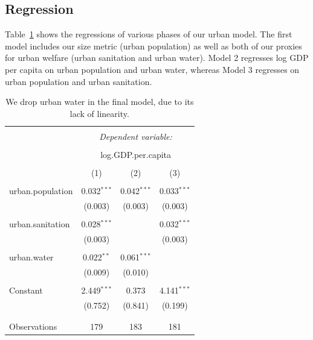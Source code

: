 \documentclass[11pt]{article}
\begin{document}
\subsection{Regression}

Table~\ref{urban_model_regressions} shows the regressions of various phases of our urban model.
The first model includes our size metric (urban population) as well as both of our proxies for urban welfare (urban sanitation and urban water).
Model 2 regresses log GDP per capita on urban population and urban water, whereas Model 3 regresses on urban population and urban sanitation.

\begin{landscape}
\begin{table}[!htbp] \centering 
  \caption{We drop urban water in the final model, due to its lack of linearity.}
  \label{urban_model_regressions} 
\begin{tabular}{@{\extracolsep{5pt}}lccc} 
\\[-1.8ex]\hline 
\hline \\[-1.8ex] 
 & \multicolumn{3}{c}{\textit{Dependent variable:}} \\ 
\cline{2-4} 
\\[-1.8ex] & \multicolumn{3}{c}{log.GDP.per.capita} \\ 
\\[-1.8ex] & (1) & (2) & (3)\\ 
\hline \\[-1.8ex] 
 urban.population & 0.032$^{***}$ & 0.042$^{***}$ & 0.033$^{***}$ \\ 
  & (0.003) & (0.003) & (0.003) \\ 
  & & & \\ 
 urban.sanitation & 0.028$^{***}$ &  & 0.032$^{***}$ \\ 
  & (0.003) &  & (0.003) \\ 
  & & & \\ 
 urban.water & 0.022$^{**}$ & 0.061$^{***}$ &  \\ 
  & (0.009) & (0.010) &  \\ 
  & & & \\ 
 Constant & 2.449$^{***}$ & 0.373 & 4.141$^{***}$ \\ 
  & (0.752) & (0.841) & (0.199) \\ 
  & & & \\ 
\hline \\[-1.8ex] 
Observations & 179 & 183 & 181 \\ 

\end{tabular}
\end{table}
\end{landscape}
\end{document}

